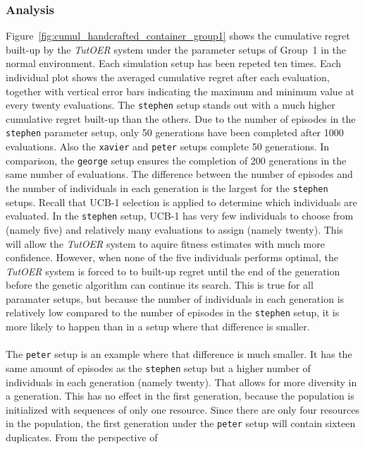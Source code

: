 \subsubsection*{Analysis}
Figure~\ref{fig:cumul_handcrafted_container_group1} shows the cumulative
regret built-up by the \emph{TutOER} system under the parameter setups of Group~1
in the normal environment. Each simulation setup has
been repeted ten times. Each individual plot shows the averaged cumulative
regret after each evaluation, together with vertical error bars indicating the
maximum and minimum value at every twenty evaluations. The \texttt{stephen} setup stands out with a
much higher cumulative regret built-up than the others. Due to the number of episodes in the
\texttt{stephen} parameter setup, only 50 generations have been completed after
1000 evaluations. Also the \texttt{xavier} and \texttt{peter} setups complete
50 generations. In comparison, the \texttt{george} setup ensures the completion
of 200 generations in the same number of evaluations. The difference between
the number of episodes and the number of individuals in each generation is the
largest for the \texttt{stephen} setups. Recall that UCB-1 selection is applied
to determine which individuals are evaluated. In the \texttt{stephen} setup,
UCB-1 has very few individuals to choose from (namely five) and relatively many
evaluations to assign (namely twenty). This will allow the \emph{TutOER} system
to aquire fitness estimates with much more confidence. However, when none of
the five individuals performs optimal, the \emph{TutOER} system is forced to
to built-up regret until the end of the generation before the genetic algorithm
can continue its search. This is true for all paramater setups, but
because the number of individuals in each generation is relatively low compared
to the number of episodes in the \texttt{stephen} setup, it is more likely to
happen than in a setup where that difference is smaller.\\\\
\noindent
The \texttt{peter}
setup is an example where that difference is much smaller. It has the same
amount of episodes as the \texttt{stephen} setup but a higher number of
individuals in each generation (namely twenty). That allows for more diversity in a
generation. This has no effect in the first generation, because the
population is initialized with sequences of only one resource. Since there are
only four resources in the population, the first generation under the
\texttt{peter} setup will contain sixteen duplicates. From the perspective of
